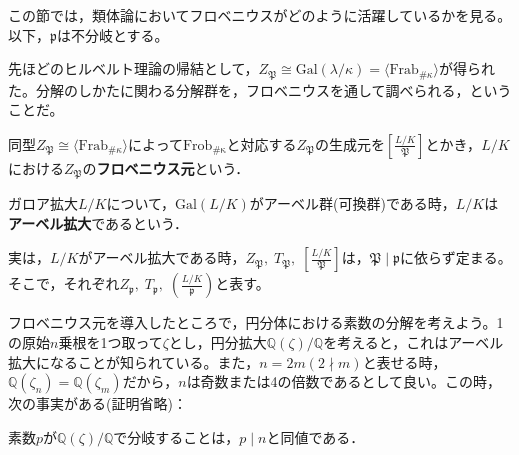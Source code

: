 この節では，類体論においてフロベニウスがどのように活躍しているかを見る。以下，$\mathfrak{p}$は不分岐とする。

先ほどのヒルベルト理論の帰結として，$Z_{\mathfrak{P}}\cong\mathrm{Gal}(\lambda/\kappa)=\langle\mathrm{Frab}_{\#\kappa}\rangle$が得られた。分解のしかたに関わる分解群を，フロベニウスを通して調べられる，ということだ。
\begin{dfn}[フロベニウス元]
    同型$Z_{\mathfrak{P}}\cong\langle\mathrm{Frab}_{\#\kappa}\rangle$によって$\mathrm{Frob_{\#\kappa}}$と対応する$Z_{\mathfrak{P}}$の生成元を$\left[\frac{L/K}{\mathfrak{P}}\right]$とかき，$L/K$における$Z_{\mathfrak{P}}$の\textbf{フロベニウス元}という．
\end{dfn}
\begin{dfn}[アーベル拡大]
    ガロア拡大$L/K$について，$\mathrm{Gal}(L/K)$がアーベル群(可換群)である時，$L/K$は\textbf{アーベル拡大}であるという．
\end{dfn}
実は，$L/K$がアーベル拡大である時，$Z_{\mathfrak{P}},\; T_{\mathfrak{P}},\; \left[\frac{L/K}{\mathfrak{P}}\right]$は，$\mathfrak{P}\mid\mathfrak{p}$に依らず定まる。そこで，それぞれ$Z_{\mathfrak{p}},\; T_{\mathfrak{p}},\; \left(\frac{L/K}{\mathfrak{p}}\right)$と表す。

フロベニウス元を導入したところで，円分体における素数の分解を考えよう。1の原始$n$乗根を1つ取って$\zeta$とし，円分拡大$\mathds{Q}(\zeta)/\mathds{Q}$を考えると，これはアーベル拡大になることが知られている。また，$n=2m\left(2\nmid m\right)$と表せる時，$\mathds{Q}(\zeta_n)=\mathds{Q}(\zeta_m)$だから，$n$は奇数または4の倍数であるとして良い。この時，次の事実がある(証明省略)：
\begin{prop}
    素数$p$が$\mathds{Q}(\zeta)/\mathds{Q}$で分岐することは，$p\mid n$と同値である．
\end{prop}

